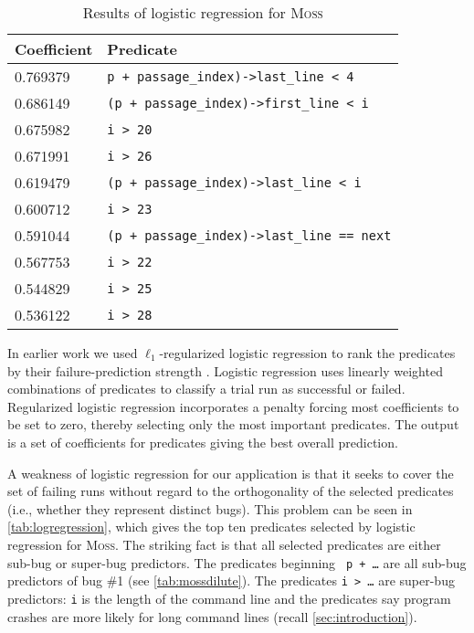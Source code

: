 \documentclass[draft]{sig-alternate}
\newcommand{\moss}{\textsc{Moss}\xspace}
\begin{document}
\begin{table}
\caption{Results of logistic regression for \moss}
\label{tab:logregression}
\centering
\small
\begin{tabular}{ll}
  \toprule
  Coefficient & Predicate \\
  \midrule
  0.769379 & \verb|p + passage_index)->last_line < 4| \\
  0.686149 & \verb|(p + passage_index)->first_line < i| \\
  0.675982 & \verb|i > 20| \\
  0.671991 & \verb|i > 26| \\
  0.619479 & \verb|(p + passage_index)->last_line < i| \\
  0.600712 & \verb|i > 23| \\
  0.591044 & \verb|(p + passage_index)->last_line == next| \\
  0.567753 & \verb|i > 22| \\
  0.544829 & \verb|i > 25| \\
  0.536122 & \verb|i > 28| \\
  \bottomrule
\end{tabular}
\end{table}

In earlier work 
we used $\ell_1$-regularized logistic regression
to rank the predicates by their
failure-prediction strength \cite{PLDI`03*141,NIPS2003_AP05}.
Logistic regression uses linearly weighted
combinations of predicates to classify a trial run as successful or
failed.  Regularized logistic regression incorporates a penalty
forcing most coefficients to be set to zero, thereby
selecting only the most important predicates.  The output is a set of
coefficients for predicates giving the best overall prediction.

A weakness of logistic regression for our application is that it seeks
to cover the set of failing runs without regard to the orthogonality
of the selected predicates (i.e., whether they represent distinct
bugs).  This problem can be seen in \autoref{tab:logregression},
which gives the top ten predicates selected by logistic regression
for \moss.  The striking fact is that all selected predicates are
either sub-bug or super-bug predictors.  The predicates beginning {\tt
p + \ldots} are all sub-bug predictors of bug \#1 (see
\autoref{tab:mossdilute}).  The predicates {\tt i > \ldots} are
super-bug predictors: {\tt i} is the length of the command line and
the predicates say program crashes are more likely for long command
lines (recall \autoref{sec:introduction}).
\end{document}
